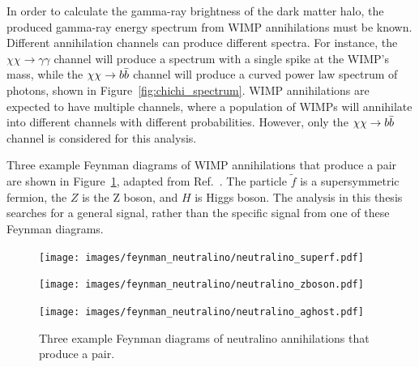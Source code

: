     
    
    In order to calculate the gamma-ray brightness of the dark matter halo, the produced gamma-ray energy spectrum from WIMP annihilations must be known.
    Different annihilation channels can produce different spectra.
    For instance, the $\chi\chi \rightarrow \gamma\gamma$ channel will produce a spectrum with a single spike at the WIMP's mass, while the $\chi\chi \rightarrow \bbbar{}$ channel will produce a curved power law spectrum of photons, shown in Figure~\ref{fig:chichi_spectrum}.
    WIMP annihilations are expected to have multiple channels, where a population of WIMPs will annihilate into different channels with different probabilities.
    However, only the $\chi\chi \rightarrow \bbbar$ channel is considered for this analysis.
    
    Three example Feynman diagrams of WIMP annihilations that produce a \bbbar pair are shown in Figure~\ref{fig:neutralino_feynman}, adapted from Ref.~\cite{Jungman:1995df}.
    The particle $\tilde{f}$ is a supersymmetric fermion, the $Z$ is the Z boson, and $H$ is Higgs boson.
    The analysis in this thesis searches for a general \bbbar signal, rather than the specific signal from one of these Feynman diagrams.
    
    \begin{figure}[h]
      \centering
      \hfill
      \begin{minipage}{0.17\textwidth}\texttt{[image: images/feynman\_neutralino/neutralino\_superf.pdf]}\end{minipage}\hfill
      \begin{minipage}{0.25\textwidth}\texttt{[image: images/feynman\_neutralino/neutralino\_zboson.pdf]}\end{minipage}\hfill
      \begin{minipage}{0.25\textwidth}\texttt{[image: images/feynman\_neutralino/neutralino\_aghost.pdf]}\end{minipage}\hfill
      \hfill
      \caption[WIMP Annihilation Feynman Diagrams]{
        Three example Feynman diagrams of neutralino annihilations that produce a \bbbar pair.
      }
      \label{fig:neutralino_feynman}
    \end{figure}

